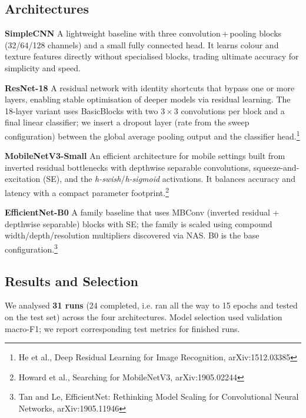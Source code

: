 \documentclass[11pt,a4paper]{article}
\begin{document}
\subsection{Architectures}
\textbf{SimpleCNN}\; A lightweight baseline with three convolution\,+\,pooling blocks (32/64/128 channels) and a small fully connected head. It learns colour and texture features directly without specialised blocks, trading ultimate accuracy for simplicity and speed.

\textbf{ResNet-18}\; A residual network with identity shortcuts that bypass one or more layers, enabling stable optimisation of deeper models via residual learning. The 18-layer variant uses BasicBlocks with two 3\,\(\times\)\,3 convolutions per block and a final linear classifier; we insert a dropout layer (rate from the sweep configuration) between the global average pooling output and the classifier head.\footnote{He et al., Deep Residual Learning for Image Recognition, arXiv:1512.03385}

\textbf{MobileNetV3-Small}\; An efficient architecture for mobile settings built from inverted residual bottlenecks with depthwise separable convolutions, squeeze-and-excitation (SE), and the \textit{h-swish}/\textit{h-sigmoid} activations. It balances accuracy and latency with a compact parameter footprint.\footnote{Howard et al., Searching for MobileNetV3, arXiv:1905.02244}

\textbf{EfficientNet-B0}\; A family baseline that uses MBConv (inverted residual + depthwise separable) blocks with SE; the family is scaled using compound width/depth/resolution multipliers discovered via NAS. B0 is the base configuration.\footnote{Tan and Le, EfficientNet: Rethinking Model Scaling for Convolutional Neural Networks, arXiv:1905.11946}

\subsection{Results and Selection}
We analysed \textbf{31 runs} (24 completed, i.e. ran all the way to 15 epochs and tested on the test set) across the four architectures. Model selection used validation macro-F1; we report corresponding test metrics for finished runs.
\end{document}
